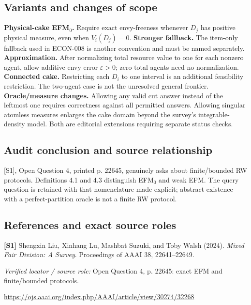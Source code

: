 \documentclass[11pt,a4paper]{article}
\begin{document}
\subsection*{Variants and changes of scope}

\textbf{Physical-cake EFM$_0$.} Require exact envy-freeness whenever $D_j$ has positive physical measure, even when $V_i(D_j)=0$. \textbf{Stronger fallback.} The item-only fallback used in ECON-008 is another convention and must be named separately. \textbf{Approximation.} After normalizing total resource value to one for each nonzero agent, allow additive envy error $\varepsilon>0$; zero-total agents need no normalization. \textbf{Connected cake.} Restricting each $D_i$ to one interval is an additional feasibility restriction. The two-agent case is not the unresolved general frontier. \textbf{Oracle/measure changes.} Allowing any valid cut answer instead of the leftmost one requires correctness against all permitted answers. Allowing singular atomless measures enlarges the cake domain beyond the survey's integrable-density model. Both are editorial extensions requiring separate status checks.

\subsection*{Audit conclusion and source relationship}

[S1], Open Question 4, printed p. 22645, genuinely asks about finite/bounded RW protocols. Definitions 4.1 and 4.3 distinguish EFM$_0$ and weak EFM. The query question is retained with that nomenclature made explicit; abstract existence with a perfect-partition oracle is not a finite RW protocol.

\subsection*{References and exact source roles}

{\footnotesize\raggedright
\par\noindent\textbf{[S1]} Shengxin Liu, Xinhang Lu, Mashbat Suzuki, and Toby Walsh (2024). \emph{Mixed Fair Division: A Survey}. Proceedings of AAAI 38, 22641–22649.\par \textit{Verified locator / source role:} Open Question 4, p. 22645: exact EFM and finite/bounded protocols.\par \url{https://ojs.aaai.org/index.php/AAAI/article/view/30274/32268}\par\smallskip
}
\end{document}
